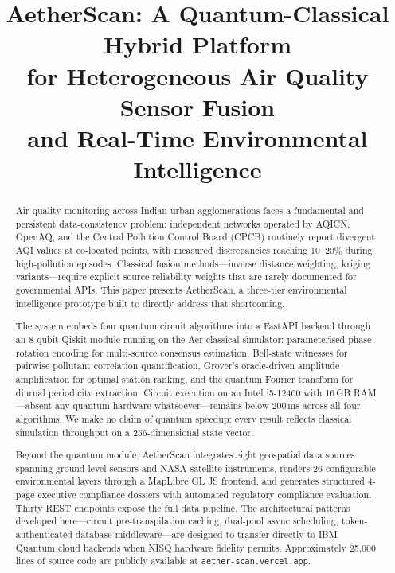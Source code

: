 \documentclass[conference]{IEEEtran}
\begin{document}
\title{AetherScan: A Quantum-Classical Hybrid Platform\\
for Heterogeneous Air Quality Sensor Fusion\\
and Real-Time Environmental Intelligence}

\author{
}

\maketitle

\begin{abstract}
Air quality monitoring across Indian urban agglomerations faces a
fundamental and persistent data-consistency problem: independent networks
operated by AQICN, OpenAQ, and the Central Pollution Control Board (CPCB)
routinely report divergent AQI values at co-located points, with measured
discrepancies reaching 10--20\% during high-pollution episodes.
Classical fusion methods---inverse distance weighting, kriging
variants---require explicit source reliability weights that are rarely
documented for governmental APIs.
This paper presents AetherScan, a three-tier environmental intelligence
prototype built to directly address that shortcoming.

The system embeds four quantum circuit algorithms into a FastAPI backend
through an 8-qubit Qiskit module running on the Aer classical simulator:
parameterised phase-rotation encoding for multi-source consensus
estimation, Bell-state witnesses for pairwise pollutant correlation
quantification, Grover's oracle-driven amplitude amplification for
optimal station ranking, and the quantum Fourier transform for diurnal
periodicity extraction.
Circuit execution on an Intel i5-12400 with 16\,GB RAM---absent any
quantum hardware whatsoever---remains below 200\,ms across all four
algorithms.
We make no claim of quantum speedup; every result reflects classical
simulation throughput on a 256-dimensional state vector.

Beyond the quantum module, AetherScan integrates eight geospatial data
sources spanning ground-level sensors and NASA satellite instruments,
renders 26 configurable environmental layers through a MapLibre GL JS
frontend, and generates structured 4-page executive compliance dossiers with
automated regulatory compliance evaluation.
Thirty REST endpoints expose the full data pipeline.
The architectural patterns developed here---circuit pre-transpilation
caching, dual-pool async scheduling, token-authenticated database
middleware---are designed to transfer directly to IBM Quantum cloud
backends when NISQ hardware fidelity permits.
Approximately 25,000 lines of source code are publicly available at
\texttt{aether-scan.vercel.app}.
\end{abstract}
\end{document}
